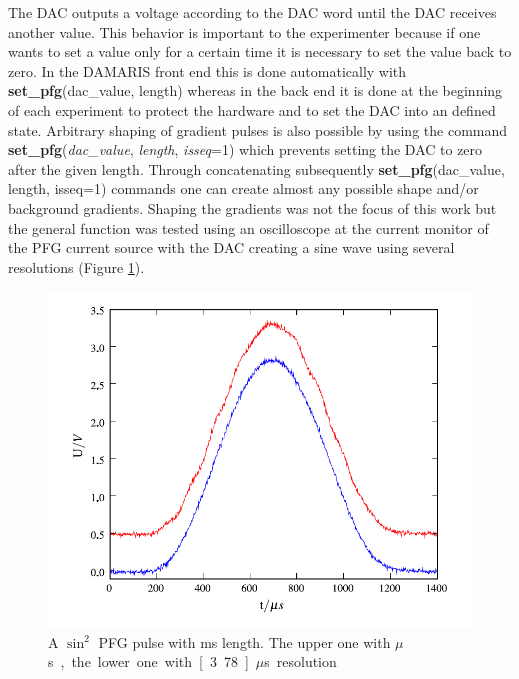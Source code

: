 \documentclass[12pt, a4paper, BCOR10mm, twoside, titlepage, headinclude]{scrbook}
\begin{document}
The DAC outputs a voltage according to the DAC word until the DAC receives another value. This behavior is important to the experimenter because if one wants to set a value only for a certain time it is necessary to set the value back to zero. In the \textsf{DAMARIS} front end this is done automatically with \textbf{set\_pfg}(dac\_value, length) whereas in the back end it is done at the beginning of each experiment to protect the hardware and to set the DAC into an defined state. 
Arbitrary shaping of gradient pulses is also possible by using the command \textbf{set\_pfg}(\textit{dac\_value}, \textit{length}, \textit{isseq}=1) which prevents setting the DAC to zero after the given length. Through concatenating subsequently \textbf{set\_pfg}(dac\_value, length, isseq=1) commands one can create almost any possible shape and/or background gradients. 
Shaping the gradients was not the focus of this work but the general function was tested using an oscilloscope at the current monitor of the PFG current source with the DAC creating a sine wave using several resolutions (Figure \ref{shapegrad}).
\begin{figure}[h]
\centering
\includegraphics[]{shapegrad1}
\caption{A $\sin^2$  PFG pulse with \unit[1]{ms} length. The upper one with \unit[100]{$\mu$s}, the lower one with \unit[3.78]{$\mu$s} resolution }
\label{shapegrad}
\end{figure}
\end{document}
